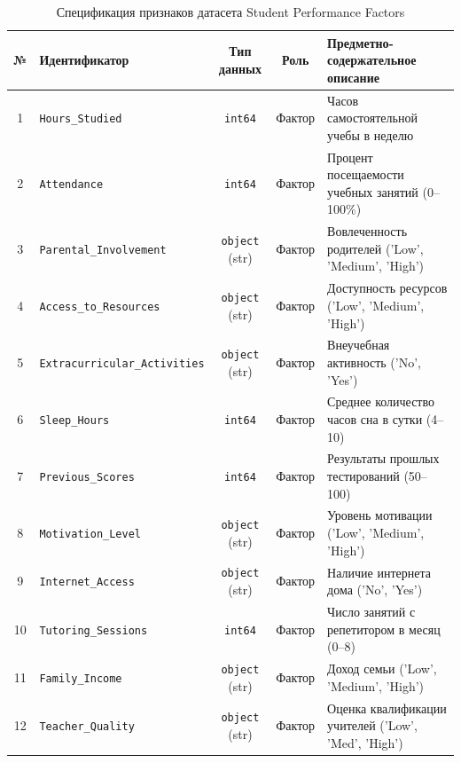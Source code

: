 \documentclass[14pt,a4paper]{extarticle}
\begin{document}
\begin{table}[H]
    \centering
    \caption{Спецификация признаков датасета Student Performance Factors}
    \label{tab:features_spec}
    \fontsize{8.5pt}{10.5pt}\selectfont
    \begin{tabularx}{\textwidth}{|c|>{\raggedright\arraybackslash}p{3.8cm}|c|c|>{\raggedright\arraybackslash}X|}
        \hline
        \textbf{№} & \textbf{Идентификатор} & \textbf{Тип данных} & \textbf{Роль} & \textbf{Предметно-содержательное описание} \\
        \hline
        1 & \texttt{Hours\_Studied} & \texttt{int64} & Фактор & Часов самостоятельной учебы в неделю \\
        \hline
        2 & \texttt{Attendance} & \texttt{int64} & Фактор & Процент посещаемости учебных занятий (0--100\%) \\
        \hline
        3 & \texttt{Parental\_Involvement} & \texttt{object} (str) & Фактор & Вовлеченность родителей ('Low', 'Medium', 'High') \\
        \hline
        4 & \texttt{Access\_to\_Resources} & \texttt{object} (str) & Фактор & Доступность ресурсов ('Low', 'Medium', 'High') \\
        \hline
        5 & \texttt{Extracurricular\_Activities} & \texttt{object} (str) & Фактор & Внеучебная активность ('No', 'Yes') \\
        \hline
        6 & \texttt{Sleep\_Hours} & \texttt{int64} & Фактор & Среднее количество часов сна в сутки (4--10) \\
        \hline
        7 & \texttt{Previous\_Scores} & \texttt{int64} & Фактор & Результаты прошлых тестирований (50--100) \\
        \hline
        8 & \texttt{Motivation\_Level} & \texttt{object} (str) & Фактор & Уровень мотивации ('Low', 'Medium', 'High') \\
        \hline
        9 & \texttt{Internet\_Access} & \texttt{object} (str) & Фактор & Наличие интернета дома ('No', 'Yes') \\
        \hline
        10 & \texttt{Tutoring\_Sessions} & \texttt{int64} & Фактор & Число занятий с репетитором в месяц (0--8) \\
        \hline
        11 & \texttt{Family\_Income} & \texttt{object} (str) & Фактор & Доход семьи ('Low', 'Medium', 'High') \\
        \hline
        12 & \texttt{Teacher\_Quality} & \texttt{object} (str) & Фактор & Оценка квалификации учителей ('Low', 'Med', 'High') \\

\end{tabularx}
\end{table}
\end{document}
